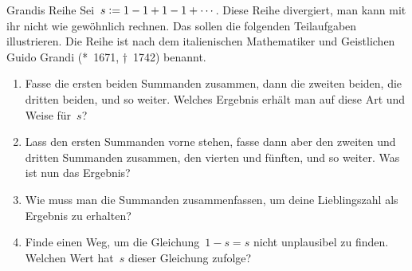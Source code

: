 \documentclass[twoside]{../zirkelblatt1415}
\theoremstyle{definition}
\theoremstyle{plain}
\theoremstyle{remark}
\newcommand{\defeq}{\vcentcolon=}
\begin{document}
\begin{aufgabe}{Grandis Reihe}\label{aufg:grandi}
Sei~$s \defeq 1 - 1 + 1 - 1 + \cdots$. Diese Reihe divergiert, man kann mit ihr
nicht wie gewöhnlich rechnen. Das sollen die folgenden Teilaufgaben
illustrieren. Die Reihe ist nach dem italienischen Mathematiker und
Geistlichen Guido Grandi (*~1671, †~1742) benannt.
\begin{enumerate}
\item Fasse die ersten beiden Summanden zusammen, dann die zweiten beiden, die
dritten beiden, und so weiter. Welches Ergebnis erhält man auf diese Art und
Weise für~$s$?
\item Lass den ersten Summanden vorne stehen, fasse dann aber den zweiten und
dritten Summanden zusammen, den vierten und fünften, und so weiter. Was
ist nun das Ergebnis?
\item Wie muss man die Summanden zusammenfassen, um deine Lieblingszahl als
Ergebnis zu erhalten?
\item Finde einen Weg, um die Gleichung~$1 - s = s$ nicht unplausibel zu
finden. Welchen Wert hat~$s$ dieser Gleichung zufolge?
\end{enumerate}\fixlistspacing
\end{aufgabe}
\end{document}
